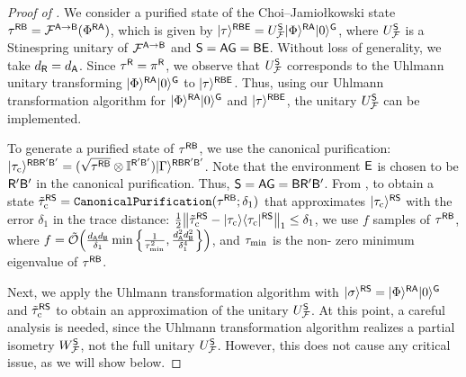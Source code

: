 \begin{proof}[Proof of ]
    


We consider a purified state of the Choi--Jamio\l kowski state $\tau^{{\mathsf{R}}{\mathsf{B}}} = {\mathcal{F}}^{{\mathsf{A}}\rightarrow{\mathsf{B}}}(\Phi^{{\mathsf{R}}{\mathsf{A}}})$, which is given by $|\tau\rangle^{{\mathsf{R}}{\mathsf{B}}{\mathsf{E}}} = U_{\mathcal{F}}^{{\mathsf{S}}}|\Phi\rangle^{{\mathsf{R}}{\mathsf{A}}}|0\rangle^{{\mathsf{G}}}$, where $U_{\mathcal{F}}^{{\mathsf{S}}}$ is a Stinespring unitary of ${\mathcal{F}}^{{\mathsf{A}}\rightarrow{\mathsf{B}}}$ and ${\mathsf{S}} = {\mathsf{A}}{\mathsf{G}} = {\mathsf{B}}{\mathsf{E}}$. Without loss of generality, we take $d_{\mathsf{R}} = d_{\mathsf{A}}$. 
Since $\tau^{{\mathsf{R}}} = \pi^{{\mathsf{R}}}$, we observe that $U_{\mathcal{F}}^{\mathsf{S}}$ corresponds to the Uhlmann unitary transforming $|\Phi\rangle^{{\mathsf{R}}{\mathsf{A}}}|0\rangle^{{\mathsf{G}}}$ to $|\tau\rangle^{{\mathsf{R}}{\mathsf{B}}{\mathsf{E}}}$.
Thus, using our Uhlmann transformation algorithm for $|\Phi\rangle^{{\mathsf{R}}{\mathsf{A}}}|0\rangle^{{\mathsf{G}}}$ and $|\tau\rangle^{{\mathsf{R}}{\mathsf{B}}{\mathsf{E}}}$, the unitary $U_{\mathcal{F}}^{{\mathsf{S}}}$ can be implemented.


To generate a purified state of $\tau^{{\mathsf{R}}{\mathsf{B}}}$, we use the canonical purification: $|\tau_{\rm c}\rangle^{{\mathsf{R}}{\mathsf{B}}{\mathsf{R}}'{\mathsf{B}}'} = (\sqrt{\tau^{{\mathsf{R}}{\mathsf{B}}}} \otimes \mathbb{I}^{{\mathsf{R}}'{\mathsf{B}}'})|\Gamma\rangle^{{\mathsf{R}}{\mathsf{B}}{\mathsf{R}}'{\mathsf{B}}'}$. Note that the environment ${\mathsf{E}}$ is chosen to be ${\mathsf{R}}'{\mathsf{B}}'$ in the canonical purification. 
Thus, ${\mathsf{S}} = {\mathsf{A}}{\mathsf{G}} = {\mathsf{B}}{\mathsf{R}}'{\mathsf{B}}'$.
From , to obtain a state $\tilde{\tau}_{\rm c}^{{\mathsf{R}}{\mathsf{S}}} = \mathtt{CanonicalPurification}(\tau^{{\mathsf{R}}{\mathsf{B}}}; \delta_1)$ that approximates $|\tau_{\rm c}\rangle^{{\mathsf{R}}{\mathsf{S}}}$ with the error $\delta_1$ in the trace distance: $\frac{1}{2}\big\|\tilde{\tau}_{\rm c}^{{\mathsf{R}}{\mathsf{S}}} - |\tau_{\rm c}\rangle\langle\tau_{\rm c}|^{{\mathsf{R}}{\mathsf{S}}}\big\|_1 \leq \delta_1$, we use $f$ samples of $\tau^{{\mathsf{R}}{\mathsf{B}}}$, where $f = \tilde{{\mathcal{O}}}\Big(\frac{d_{\mathsf{A}} d_{\mathsf{B}}}{\delta_1}\min\Big\{ \frac{1}{\tau_{\rm min}^2}, \frac{d_{\mathsf{A}}^2 d_{\mathsf{B}}^2}{\delta_1^4}\Big\}\Big)$, and $\tau_{\rm min}$ is the non- zero minimum eigenvalue of $\tau^{{\mathsf{R}}{\mathsf{B}}}$.



Next, we apply the Uhlmann transformation algorithm with $|\sigma\rangle^{{\mathsf{R}}{\mathsf{S}}} = |\Phi\rangle^{{\mathsf{R}}{\mathsf{A}}}|0\rangle^{{\mathsf{G}}}$ and $\tilde{\tau}_{\rm c}^{{\mathsf{R}}{\mathsf{S}}}$ to obtain an approximation of the unitary $U_{\mathcal{F}}^{\mathsf{S}}$.
At this point, a careful analysis is needed, since the Uhlmann transformation algorithm realizes a partial isometry $W_{\mathcal{F}}^{\mathsf{S}}$, not the full unitary $U_{\mathcal{F}}^{\mathsf{S}}$.
However, this does not cause any critical issue, as we will show below.




\end{proof}

